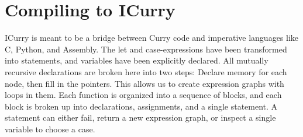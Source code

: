 \documentclass{book}
\theoremstyle{definition}
\begin{document}
\section{Compiling to ICurry}

ICurry is meant to be a bridge between Curry code and imperative languages like C, Python, and Assembly.
The let and case-expressions have been transformed into statements,
and variables have been explicitly declared.
All mutually recursive declarations are broken here into two steps:
Declare memory for each node, 
then fill in the pointers.
This allows us to create expression graphs with loops in them.
Each function is organized into a sequence of blocks,
and each block is broken up into declarations, assignments, and a single statement.
A statement can either fail, return a new expression graph, 
or inspect a single variable to choose a case.
\end{document}
